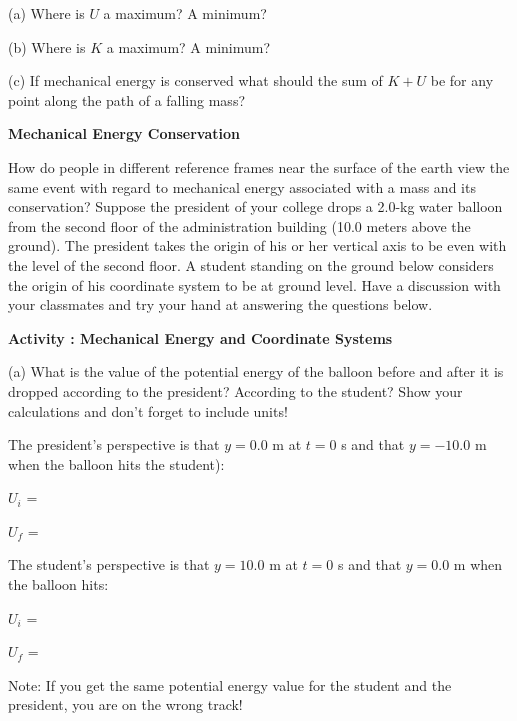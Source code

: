 (a) Where is $U$ a maximum? A minimum?
\vspace{20mm}

(b) Where is $K$ a maximum? A minimum?
\vspace{20mm}

(c) If mechanical energy is conserved what should the sum of $K+ U$ be for any
point along the path of a falling mass?
\vspace{20mm}


\textbf{Mechanical Energy Conservation }

How do people in different reference frames near the surface of the earth view
the same event with regard to mechanical energy associated with a mass and its
conservation? Suppose the president of your college drops a 2.0-kg 
water balloon
from the second floor of the administration building (10.0 meters above the
ground). The president takes the origin of his or her vertical axis to be even
with the level of the second floor. A student standing on the ground below considers
the origin of his coordinate system to be at ground level. Have a discussion
with your classmates and try your hand at answering the questions below.

\textbf{Activity : Mechanical Energy and Coordinate Systems} 

(a) What is the value of the potential energy of the balloon before and after
it is dropped according to the president? According to the student? Show your
calculations and don't forget to include units!

The president's perspective is that $y = 0.0$ m at $t = 0$ s and that 
$y = -10.0$ m
when the balloon hits the student): 
\vspace{5mm}

\( U_{i} \) = 
\vspace{5mm}

\( U_{f} \) =
\vspace{5mm}

The student's perspective is that $y = 10.0$ m at $t = 0$ s and that 
$y = 0.0$ m when
the balloon hits: 
\vspace{5mm}

\( U_{i} \) = 
\vspace{5mm}

\( U_{f} \) =
\vspace{5mm}

Note: If you get the same potential energy value for the student and the president,
you are on the wrong track!

